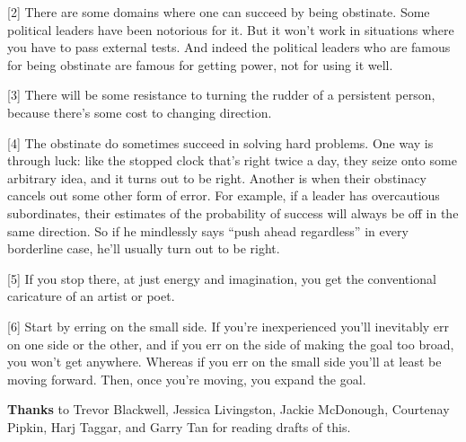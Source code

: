 {[}2{]} There are some domains where one can succeed by being obstinate.
Some political leaders have been notorious for it. But it won't work in
situations where you have to pass external tests. And indeed the
political leaders who are famous for being obstinate are famous for
getting power, not for using it well.

{[}3{]} There will be some resistance to turning the rudder of a
persistent person, because there's some cost to changing direction.

{[}4{]} The obstinate do sometimes succeed in solving hard problems. One
way is through luck: like the stopped clock that's right twice a day,
they seize onto some arbitrary idea, and it turns out to be right.
Another is when their obstinacy cancels out some other form of error.
For example, if a leader has overcautious subordinates, their estimates
of the probability of success will always be off in the same direction.
So if he mindlessly says ``push ahead regardless'' in every borderline
case, he'll usually turn out to be right.

{[}5{]} If you stop there, at just energy and imagination, you get the
conventional caricature of an artist or poet.

{[}6{]} Start by erring on the small side. If you're inexperienced
you'll inevitably err on one side or the other, and if you err on the
side of making the goal too broad, you won't get anywhere. Whereas if
you err on the small side you'll at least be moving forward. Then, once
you're moving, you expand the goal.

\textbf{Thanks} to Trevor Blackwell, Jessica Livingston, Jackie
McDonough, Courtenay Pipkin, Harj Taggar, and Garry Tan for reading
drafts of this.
